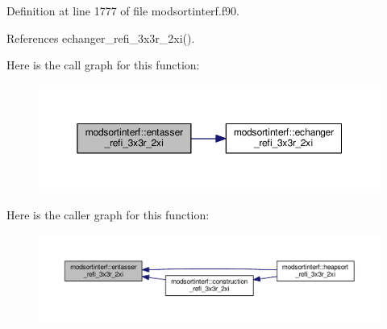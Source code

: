 Definition at line 1777 of file modsortinterf.\+f90.



References echanger\+\_\+refi\+\_\+3x3r\+\_\+2xi().



Here is the call graph for this function\+:\nopagebreak
\begin{figure}[H]
\begin{center}
\leavevmode
\includegraphics[width=350pt]{namespacemodsortinterf_a3940381bb819de48a45d458bc9c8abc0_cgraph}
\end{center}
\end{figure}




Here is the caller graph for this function\+:\nopagebreak
\begin{figure}[H]
\begin{center}
\leavevmode
\includegraphics[width=350pt]{namespacemodsortinterf_a3940381bb819de48a45d458bc9c8abc0_icgraph}
\end{center}
\end{figure}


